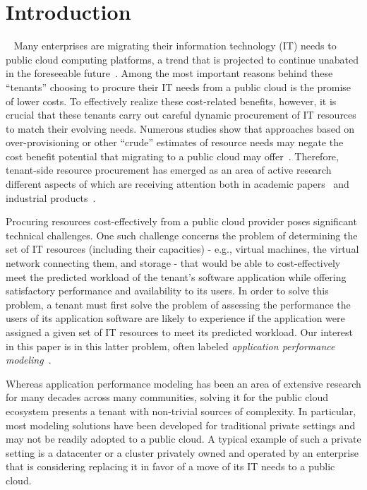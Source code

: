 \documentclass{acm_proc_article-sp}
\newcommand{\bu}[1]{#1}%
\begin{document}

\section{Introduction}


~\bu{
Many enterprises are migrating their information technology (IT) needs to public cloud computing platforms, a trend that is projected to continue unabated in the foreseeable future~\cite{xxx}. Among the most important reasons behind these ``tenants'' choosing to procure their IT needs from a public cloud is the promise of lower costs. To effectively realize these cost-related benefits, however, it is crucial that these tenants carry out careful dynamic procurement of IT resources to match their evolving needs. Numerous studies show that approaches based on over-provisioning or other ``crude'' estimates of resource needs may negate the cost benefit potential that migrating to a public cloud may offer~\cite{xxx}. Therefore, tenant-side resource procurement has emerged as an area of active research different aspects of which are receiving attention both in academic papers~\cite{xxx} and industrial products~\cite{xxx}. 

Procuring resources cost-effectively from a public cloud provider poses significant technical challenges. One such challenge concerns the problem of determining the set of IT resources (including their capacities) - e.g., virtual machines, the virtual network connecting them, and storage - that would be able to cost-effectively meet the predicted workload of the tenant's software application while offering satisfactory performance and availability to its users. In order to solve this problem, a tenant must first solve the problem of assessing the performance the users of its application software are likely to experience if the application were assigned a given set of IT resources to meet its predicted workload. Our interest in this paper is in this latter problem, often labeled {\it application performance modeling}~\cite{xxx}. 


Whereas application performance modeling has been an area of extensive research for many decades across many communities, solving it for the public cloud ecosystem presents a tenant with non-trivial sources of complexity. In particular, most modeling solutions have been developed for traditional private settings and may not be readily adopted to a public cloud. A typical example of such a private setting is a  datacenter or a cluster privately owned and operated by an enterprise that is considering replacing it in favor of a move of its IT needs to a public cloud. 

}
\end{document}
